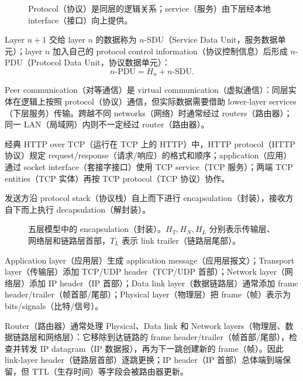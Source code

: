 \begin{figure}[htbp]
  \centering
  \resizebox{0.92\textwidth}{!}{}
  \caption{Protocol（协议）是同层的逻辑关系；service（服务）由下层经本地 interface（接口）向上提供。}
  \label{fig:sc2008-l01-peer-service}
\end{figure}

Layer $n+1$ 交给 layer $n$ 的数据称为 $n$-SDU（Service Data Unit，服务数据单元）；layer $n$ 加入自己的 protocol control information（协议控制信息）后形成 $n$-PDU（Protocol Data Unit，协议数据单元）：
\[
  n\text{-PDU}=H_n+n\text{-SDU}.
\]

Peer communication（对等通信）是 virtual communication（虚拟通信）：同层实体在逻辑上按照 protocol（协议）通信，但实际数据需要借助 lower-layer services（下层服务）传输。跨越不同 networks（网络）时通常经过 routers（路由器）；同一 LAN（局域网）内则不一定经过 router（路由器）。

经典 HTTP over TCP（运行在 TCP 上的 HTTP）中，HTTP protocol（HTTP 协议）规定 request/response（请求/响应）的格式和顺序；application（应用）通过 socket interface（套接字接口）使用 TCP service（TCP 服务）；两端 TCP entities（TCP 实体）再按 TCP protocol（TCP 协议）协作。


发送方沿 protocol stack（协议栈）自上而下进行 encapsulation（封装），接收方自下而上执行 decapsulation（解封装）。

\begin{figure}[htbp]
  \centering
  \resizebox{\textwidth}{!}{}
  \caption{五层模型中的 encapsulation（封装）。$H_T,H_N,H_L$ 分别表示传输层、网络层和链路层首部，$T_L$ 表示 link trailer（链路层尾部）。}
  \label{fig:sc2008-l01-encapsulation}
\end{figure}

Application layer（应用层）生成 application message（应用层报文）；Transport layer（传输层）添加 TCP/UDP header（TCP/UDP 首部）；Network layer（网络层）添加 IP header（IP 首部）；Data link layer（数据链路层）通常添加 frame header/trailer（帧首部/尾部）；Physical layer（物理层）把 frame（帧）表示为 bits/signals（比特/信号）。

Router（路由器）通常处理 Physical、Data link 和 Network layers（物理层、数据链路层和网络层）：它移除到达链路的 frame header/trailer（帧首部/尾部），检查并转发 IP datagram（IP 数据报），再为下一跳创建新的 frame（帧）。因此 link-layer header（链路层首部）逐跳更换；IP header（IP 首部）总体端到端保留，但 TTL（生存时间）等字段会被路由器更新。


